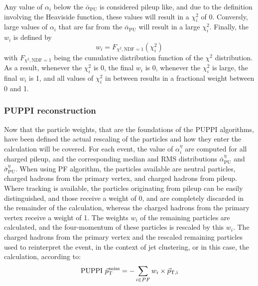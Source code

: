 Any value of $\alpha_i$ below the $\bar{\alpha}_{\text{PU}}$ is considered pileup like, and due to the definition involving the Heaviside function, these values will result in a $\chi_{i}^{2}$ of 0.  
Conversly, large values of $\alpha_i$ that are far from the $\bar{\alpha}_{\text{PU}}$ will result in a large $\chi_{i}^{2}$.
Finally, the $w_{i}$ is defined by
\begin{equation}
w_{i} = F_{\chi^{2}, \mathrm{NDF}=1}(\chi_{i}^{2})
\end{equation} 
with $ F_{\chi^{2}, \mathrm{NDF}=1}$ being the cumulative distribution function of the  $\chi^{2}$ distribution. 
As a result, whenever the $\chi_{i}^{2}$ is 0, the final $w_i$ is 0, whenever the $\chi_{i}^{2}$ is large, the final $w_i$ is 1, and all values of $\chi_{i}^{2}$ in between results in a fractional weight between 0 and 1. 
\subsubsection*{PUPPI \ptmiss reconstruction}
\noindent
\justify
Now that the particle weights, that are the foundations of the PUPPI algorithms, have been defined the actual rescaling of the particles and how they enter the \ptmiss calculation will be covered. 
For each event, the value of $\alpha_{i}^{\eta}$ are computed for all charged pileup, and the corresponding median and RMS distributions $\bar{\alpha}_{\text{PU}}^{\eta}$ and $\bar{\sigma}_{\text{PU}}^{\eta}$. 
When using PF algorithm, the particles available are neutral particles, charged hadrons from the primary vertex, and charged hadrons from pileup. 
Where tracking is available, the particles originating from pileup can be easily distinguished, and those receive a weight of 0, and are completely discarded in the remainder of the calculation, whereas the charged hadrons from the primary vertex receive a weight of 1. 
The weights $w_i$ of the remaining particles are calculated, and the four-momentum of these particles is rescaled by this $w_i$. 
The charged hadrons from the primary vertex and the rescaled remaining particles used to reinterpret the event, in the context of jet clustering, or in this case, the \ptmiss calculation, according to:
\begin{equation}
\mathrm{PUPPI}\,\, {\vec p}_{\mathrm{T}}^{\kern1pt\text{miss}} =- \sum_{i\in PF} w_i \times \vec{p}_{\mathrm{T, i}}             
\end{equation}   
